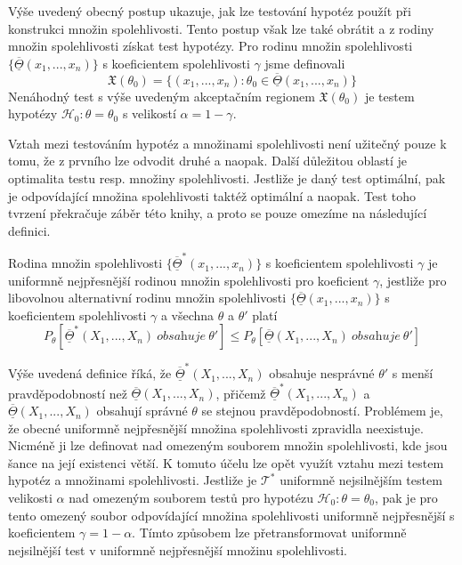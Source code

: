 Výše uvedený obecný postup ukazuje, jak lze testování hypotéz použít při konstrukci množin spolehlivosti. Tento postup však lze také obrátit a z rodiny množin spolehlivosti získat test hypotézy. Pro rodinu množin spolehlivosti $\{\overline{\underline{\Theta}}(x_1, ..., x_n)\}$ s koeficientem spolehlivosti $\gamma$ jsme definovali
\begin{equation*}
\mathfrak{X}(\theta_0) = \{(x_1, ..., x_n): \theta_0 \in \overline{\underline{\Theta}}(x_1, ..., x_n)\}
\end{equation*}
Nenáhodný test s výše uvedeným akceptačním regionem $\mathfrak{X}(\theta_0)$ je testem hypotézy $\mathscr{H}_0: \theta = \theta_0$ s velikostí $\alpha = 1 - \gamma$.

Vztah mezi testováním hypotéz a množinami spolehlivosti není užitečný pouze k tomu, že z prvního lze odvodit druhé a naopak. Další důležitou oblastí je optimalita testu resp. množiny spolehlivosti. Jestliže je daný test optimální, pak je odpovídající množina spolehlivosti taktéž optimální a naopak. Test toho tvrzení překračuje záběr této knihy, a proto se pouze omezíme na následující definici.

\begin{definition}
Rodina množin spolehlivosti $\{\overline{\underline{\Theta}}^*(x_1, ..., x_n)\}$ s koeficientem spolehlivosti $\gamma$ je uniformně nejpřesnější rodinou množin spolehlivosti pro koeficient $\gamma$, jestliže pro libovolnou alternativní rodinu množin spolehlivosti $\{\overline{\underline{\Theta}}(x_1, ..., x_n)\}$ s koeficientem spolehlivosti $\gamma$ a všechna $\theta$ a $\theta'$ platí
\begin{equation*}
P_{\theta}[\overline{\underline{\Theta}}^*(X_1, ..., X_n) ~ \textit{obsahuje} ~ \theta'] \le P_{\theta}[\overline{\underline{\Theta}}(X_1, ..., X_n) ~ \textit{obsahuje} ~ \theta']
\end{equation*}
\end{definition}

Výše uvedená definice říká, že $\overline{\underline{\Theta}}^*(X_1, ..., X_n)$ obsahuje nesprávné $\theta'$ s menší pravděpodobností než $\overline{\underline{\Theta}}(X_1, ..., X_n)$, přičemž $\overline{\underline{\Theta}}^*(X_1, ..., X_n)$ a $\overline{\underline{\Theta}}(X_1, ..., X_n)$ obsahují správné $\theta$ se stejnou pravděpodobností. Problémem je, že obecné uniformně nejpřesnější množina spolehlivosti zpravidla neexistuje. Nicméně ji lze definovat nad omezeným souborem množin spolehlivosti, kde jsou šance na její existenci větší. K tomuto účelu lze opět využít vztahu mezi testem hypotéz a množinami spolehlivosti. Jestliže je $\mathscr{T}^*$ uniformně nejsilnějším testem velikosti $\alpha$ nad omezeným souborem testů pro hypotézu $\mathscr{H_0}: \theta = \theta_0$, pak je pro tento omezený soubor odpovídající množina spolehlivosti uniformně nejpřesnější s koeficientem $\gamma = 1 - \alpha$. Tímto způsobem lze přetransformovat uniformně nejsilnější test v uniformně nejpřesnější množinu spolehlivosti.


